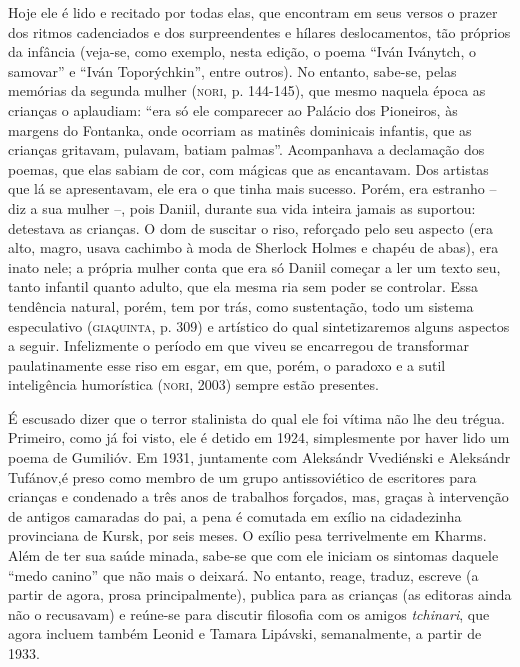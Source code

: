 Hoje ele é lido e recitado por todas elas, que encontram em seus versos
o prazer dos ritmos cadenciados e dos surpreendentes e hílares
deslocamentos, tão próprios da infância (veja-se, como exemplo, nesta
edição, o poema ``Iván Iványtch, o samovar'' e ``Iván Toporýchkin'',
entre outros). No entanto, sabe-se, pelas memórias da segunda mulher
(\textsc{nori}, p. 144-145), que mesmo naquela época as crianças o
aplaudiam: ``era só ele comparecer ao Palácio dos Pioneiros, às margens
do Fontanka, onde ocorriam as matinês dominicais infantis, que as
crianças gritavam, pulavam, batiam palmas''. Acompanhava a declamação
dos poemas, que elas sabiam de cor, com mágicas que as encantavam. Dos
artistas que lá se apresentavam, ele era o que tinha mais sucesso.
Porém, era estranho -- diz a sua mulher --, pois Daniil, durante sua
vida inteira jamais as suportou: detestava as crianças. O dom de
suscitar o riso, reforçado pelo seu aspecto (era alto, magro, usava
cachimbo à moda de Sherlock Holmes e chapéu de abas), era inato nele; a
própria mulher conta que era só Daniil começar a ler um texto seu, tanto
infantil quanto adulto, que ela mesma ria sem poder se controlar. Essa
tendência natural, porém, tem por trás, como sustentação, todo um
sistema especulativo (\textsc{giaquinta}, p. 309) e artístico do qual
sintetizaremos alguns aspectos a seguir. Infelizmente o período em que
viveu se encarregou de transformar paulatinamente esse riso em esgar, em
que, porém, o paradoxo e a sutil inteligência humorística
(\textsc{nori}, 2003) sempre estão presentes.

É escusado dizer que o terror stalinista do qual ele foi vítima não lhe
deu trégua. Primeiro, como já foi visto, ele é detido em 1924,
simplesmente por haver lido um poema de Gumilióv. Em 1931, juntamente
com Aleksándr Vvediénski e Aleksándr Tufánov,é preso como membro de um
grupo antissoviético de escritores para crianças e condenado a três anos
de trabalhos forçados, mas, graças à intervenção de antigos camaradas do
pai, a pena é comutada em exílio na cidadezinha provinciana de Kursk,
por seis meses. O exílio pesa terrivelmente em Kharms. Além de ter sua
saúde minada, sabe-se que com ele iniciam os sintomas daquele ``medo
canino'' que não mais o deixará. No entanto, reage, traduz, escreve (a
partir de agora, prosa principalmente), publica para as crianças (as
editoras ainda não o recusavam) e reúne-se para discutir filosofia com
os amigos \emph{tchinari}, que agora incluem também Leonid e Tamara
Lipávski, semanalmente, a partir de 1933.

